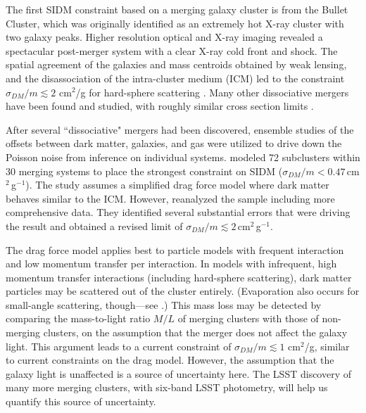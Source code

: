
The first SIDM constraint based on a merging galaxy cluster is from the Bullet Cluster, which was originally identified as an extremely hot X-ray cluster with two galaxy peaks. Higher resolution optical and X-ray imaging revealed a spectacular post-merger system with a clear X-ray cold front and shock. The spatial agreement of the galaxies and mass centroids obtained by weak lensing, and the disassociation of the intra-cluster medium (ICM) led to the constraint $\sigma_{DM}/m \lesssim 2$ cm$^2$/g for hard-sphere scattering \citep{Markevitch2004,Randall:2007ph,2017MNRAS.465..569R,Robertson:2016qef}. Many other dissociative mergers have been found and studied, with roughly similar cross section limits \citep[but with greater systematic uncertainty, \eg][]{bradac2008}. 

After several ``dissociative" mergers had been discovered, ensemble studies of the offsets between dark matter, galaxies, and gas were utilized to drive down the Poisson noise from inference on individual systems. \citet{Harvey:2015hha} modeled 72 subclusters within 30 merging systems to place the strongest constraint on SIDM ($\sigma_{DM}/m<0.47$\,cm$^{2}$\,g$^{-1}$).
The study assumes a simplified drag force model where dark matter behaves similar to the ICM. However, \citet{Wittman:2017gxn} reanalyzed the sample including more comprehensive data. They identified several substantial errors that were driving the result and obtained a revised limit of $\sigma_{DM}/m\lesssim 2$\,cm$^{2}$\,g$^{-1}$.

The drag force model applies best to particle models with frequent interaction and low momentum transfer per interaction. In models with infrequent, high momentum transfer interactions (including hard-sphere scattering), dark matter particles may be scattered out of the cluster entirely. (Evaporation also occurs for small-angle scattering, though---see \citep{Kahlhoefer:2013dca}.) This mass loss may be detected by comparing the mass-to-light ratio $M/L$ of merging clusters with those of non-merging clusters, on the assumption that the merger does not affect the galaxy light. This argument leads to a current constraint of $\sigma_{DM}/m \lesssim 1$ cm$^2$/g, similar to current constraints on the drag model. However, the assumption that the galaxy light is unaffected is a source of uncertainty here. The LSST discovery of many more merging clusters, with six-band LSST photometry, will help us quantify this source of uncertainty. 

